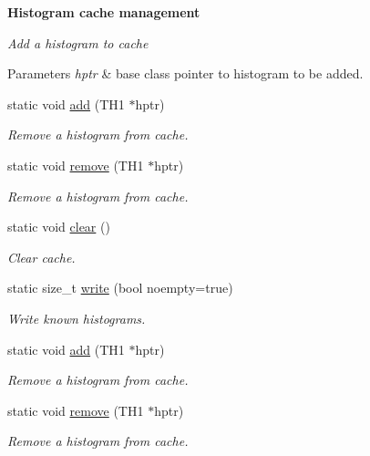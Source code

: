 \begin{Indent}{\bf Histogram cache management}\par
{\em Add a histogram to cache


\begin{DoxyParams}{Parameters}
{\em hptr} & base class pointer to histogram to be added. \\
\hline
\end{DoxyParams}
}\begin{DoxyCompactItemize}
\item 
static void \hyperlink{classHistUtils_1_1HistMgr_a0ddb91771b282ca41a4b7b916f8e7e2c}{add} (T\+H1 $\ast$hptr)
\begin{DoxyCompactList}\small\item\em Remove a histogram from cache. \end{DoxyCompactList}\item 
static void \hyperlink{classHistUtils_1_1HistMgr_a0f2238621b12aa2e768f804344d15915}{remove} (T\+H1 $\ast$hptr)
\begin{DoxyCompactList}\small\item\em Remove a histogram from cache. \end{DoxyCompactList}\item 
static void \hyperlink{classHistUtils_1_1HistMgr_a43c6a46f880d56f843ecf0b6d920426d}{clear} ()
\begin{DoxyCompactList}\small\item\em Clear cache. \end{DoxyCompactList}\item 
static size\+\_\+t \hyperlink{classHistUtils_1_1HistMgr_a9af371f98ca15a96b7090e6ab3785998}{write} (bool noempty=true)
\begin{DoxyCompactList}\small\item\em Write known histograms. \end{DoxyCompactList}\item 
static void \hyperlink{classHistUtils_1_1HistMgr_a0ddb91771b282ca41a4b7b916f8e7e2c}{add} (T\+H1 $\ast$hptr)
\begin{DoxyCompactList}\small\item\em Remove a histogram from cache. \end{DoxyCompactList}\item 
static void \hyperlink{classHistUtils_1_1HistMgr_a0f2238621b12aa2e768f804344d15915}{remove} (T\+H1 $\ast$hptr)
\begin{DoxyCompactList}\small\item\em Remove a histogram from cache. \end{DoxyCompactList}\item 

\end{DoxyCompactItemize}
\end{Indent}
